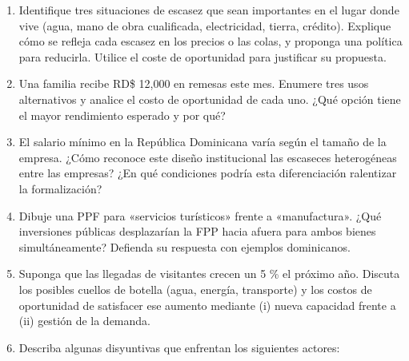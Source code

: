 \documentclass[
  letterpaper,
  DIV=11,
  numbers=noendperiod,
  oneside]{scrreprt}
\begin{document}
\begin{enumerate}
\def\labelenumi{\arabic{enumi}.}
\item
  Identifique tres situaciones de escasez que sean importantes en el
  lugar donde vive (agua, mano de obra cualificada, electricidad,
  tierra, crédito). Explique cómo se refleja cada escasez en los precios
  o las colas, y proponga una política para reducirla. Utilice el coste
  de oportunidad para justificar su propuesta.
\item
  Una familia recibe RD\$ 12,000 en remesas este mes. Enumere tres usos
  alternativos y analice el costo de oportunidad de cada uno. ¿Qué
  opción tiene el mayor rendimiento esperado y por qué?
\item
  El salario mínimo en la República Dominicana varía según el tamaño de
  la empresa. ¿Cómo reconoce este diseño institucional las escaseces
  heterogéneas entre las empresas? ¿En qué condiciones podría esta
  diferenciación ralentizar la formalización?
\item
  Dibuje una PPF para «servicios turísticos» frente a «manufactura».
  ¿Qué inversiones públicas desplazarían la FPP hacia afuera para ambos
  bienes simultáneamente? Defienda su respuesta con ejemplos
  dominicanos.
\item
  Suponga que las llegadas de visitantes crecen un 5 \% el próximo año.
  Discuta los posibles cuellos de botella (agua, energía, transporte) y
  los costos de oportunidad de satisfacer ese aumento mediante (i) nueva
  capacidad frente a (ii) gestión de la demanda.
\item
  Describa algunas disyuntivas que enfrentan los siguientes actores:


\end{enumerate}
\end{document}
